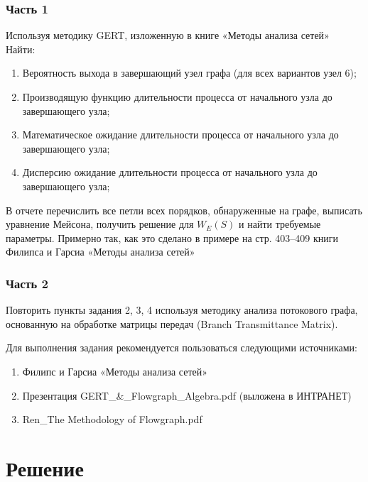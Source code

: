 \subsubsection{Часть 1}
Используя методику GERT, изложенную в книге «Методы анализа сетей»\\
Найти:
\begin{enumerate}
\item Вероятность выхода в завершающий узел графа (для всех вариантов узел 6);
\item Производящую функцию длительности процесса от начального узла  до завершающего узла;
\item Математическое ожидание длительности процесса от начального узла  до завершающего узла;
\item Дисперсию ожидание длительности процесса от начального узла  до завершающего узла;
\end{enumerate}
В отчете перечислить все петли всех порядков, обнаруженные на графе, выписать уравнение Мейсона, получить решение для $W_E(S)$ и найти требуемые параметры. Примерно так, как это сделано в примере на стр. 403–409 книги Филипса и Гарсиа «Методы анализа сетей»
\subsubsection{Часть 2}
Повторить пункты задания 2, 3, 4 используя методику анализа потокового графа, основанную на обработке матрицы передач (Branch Transmittance Matrix). 


Для выполнения задания рекомендуется пользоваться следующими источниками:
\begin{enumerate}
\item Филипс и Гарсиа «Методы анализа сетей»
\item Презентация GERT\_\&\_Flowgraph\_Algebra.pdf (выложена в ИНТРАНЕТ)
\item Ren\_The Methodology of Flowgraph.pdf
\end{enumerate}

\section{Решение}
